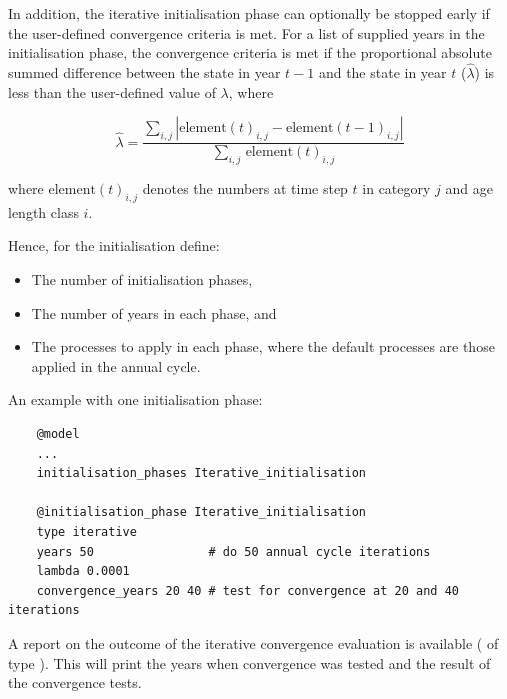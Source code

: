 In addition, the iterative initialisation phase can optionally be stopped early if the user-defined convergence criteria is met. For a list of supplied years in the initialisation phase, the convergence criteria is met if the proportional absolute summed difference between the state in year $t-1$ and the state in year $t$ ($\widehat{\lambda}$) is less than the user-defined value of $\lambda$, where

\begin{equation}
  \widehat{\lambda} = \frac{\sum\limits_{i,j}  \left|\text{element}(t)_{i,j} - \text{element}(t-1)_{i,j} \right|}{\sum\limits_{i,j} \frac{}{}\text{element}(t)_{i,j}}
\end{equation}

where $\text{element}(t)_{i,j}$ denotes the numbers at time step $t$ in category $j$ and \ifAgeBased age \else length class \fi $i$.

Hence, for the initialisation define:

\begin{itemize}
  \item The number of initialisation phases,
  \item The number of years in each phase, and
  \item The processes to apply in each phase, where the default processes are those applied in the annual cycle.
\end{itemize}

An example with one initialisation phase:

{\small{\begin{verbatim}
	@model
	...
	initialisation_phases Iterative_initialisation
	
	@initialisation_phase Iterative_initialisation
	type iterative
	years 50                # do 50 annual cycle iterations
	lambda 0.0001
	convergence_years 20 40 # test for convergence at 20 and 40 iterations
\end{verbatim}}}

A report on the outcome of the iterative convergence evaluation is available ( of type ). This will print the years when convergence was tested and the result of the convergence tests.

\ifAgeBased
\paragraph{}\label{sec:InitialisationPhase-Derived}

